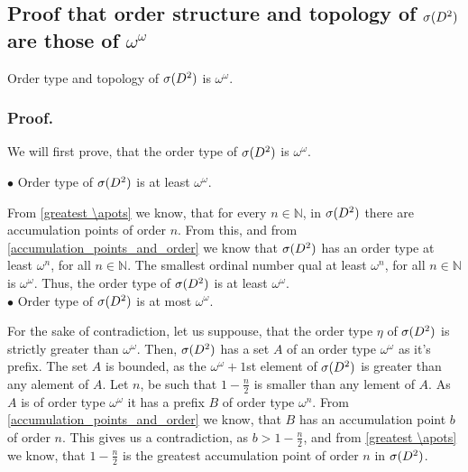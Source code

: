 \subsection{Proof that order structure and topology of ${{\sigma}(D^2)}$ are those of $\omega^\omega$}
\begin{theorem}\label{speD_order_type}
Order type and topology of ${{\sigma}(D^2)}$ is $\omega^\omega$. 
\end{theorem}
\subsubsection{Proof.} 

We will first prove, that the order type of ${{\sigma}(D^2)}$ is $\omega^\omega$.

$\bullet$ Order type of ${{\sigma}(D^2)}$ is at least $\omega^\omega$.

From \ref{greatest \apots} we know, that for every $n\in \mathbb{N}$, in ${{\sigma}(D^2)}$ there are 
accumulation points of order $n$. From this, and from \ref{accumulation_points_and_order} 
we know that ${{\sigma}(D^2)}$ has an order type at least $\omega^n$, for all $n\in \mathbb{N}$. 
The smallest ordinal number qual at least $\omega^n$, for all $n \in \mathbb{N}$ is 
$\omega^\omega$. Thus, the order type of ${{\sigma}(D^2)}$ is at least $\omega^\omega$.\\

$\bullet$ Order type of ${{\sigma}(D^2)}$ is at most $\omega^\omega$.

For the sake of contradiction, let us suppouse, that the order type $\eta$ of ${{\sigma}(D^2)}$ is 
strictly greater than $\omega^\omega$. Then, ${{\sigma}(D^2)}$ has a set $A$ of an order type 
$\omega^\omega$ as it's prefix. The set $A$ is bounded, as the $\omega^\omega+1$st element of 
${{\sigma}(D^2)}$ is greater than any alement of $A$. 
Let $n$, be such that $1-\frac{n}{2}$ is smaller than any lement of $A$. 
As $A$ is of order type $\omega^\omega$ it has a prefix $B$ of order type $\omega^n$.
From \ref{accumulation_points_and_order} we know, that $B$ has an accumulation point $b$ 
of order $n$. This gives us a contradiction, as $b > 1-\frac{n}{2}$, and from \ref{greatest \apots} 
we know, that $1-\frac{n}{2}$ is the greatest accumulation point of order $n$ in ${{\sigma}(D^2)}$. \\

